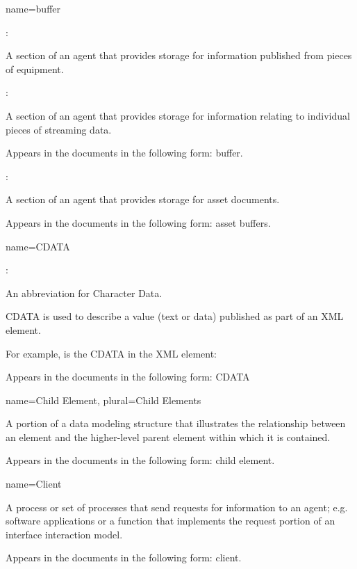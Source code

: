 {
  name={buffer}
}
{
  :

  A section of an \gls{agent} that provides storage for information published from pieces of equipment.

  :

  A section of an \gls{agent} that provides storage for information relating to individual pieces of \gls{streaming data}. 
  
  Appears in the documents in the following form: \gls{buffer}.

  :

  A section of an \gls{agent} that provides storage for \glspl{asset document}.

  Appears in the documents in the following form: \glspl{asset buffer}.
}

{
  name={CDATA}
}
{
  :

  An abbreviation for Character Data.

  CDATA is used to describe a value (text or data) published as part of an XML element.

  For example,  is the CDATA in the XML element:
  
  \tab {}

  Appears in the documents in the following form: CDATA
}


{
  name={Child Element},
  plural={Child Elements}
}
{
  A portion of a data modeling structure that illustrates the relationship between an element and the higher-level \gls{parent element} within which it is contained.
  
  Appears in the documents in the following form: \gls{child element}.
}


{
  name={Client}
}
{
  A process or set of processes that send \glspl{request} for information to an \gls{agent}; e.g. software applications or a function that implements the \gls{request} portion of an \gls{interface} \gls{interaction model}.

  Appears in the documents in the following form: client.
}

